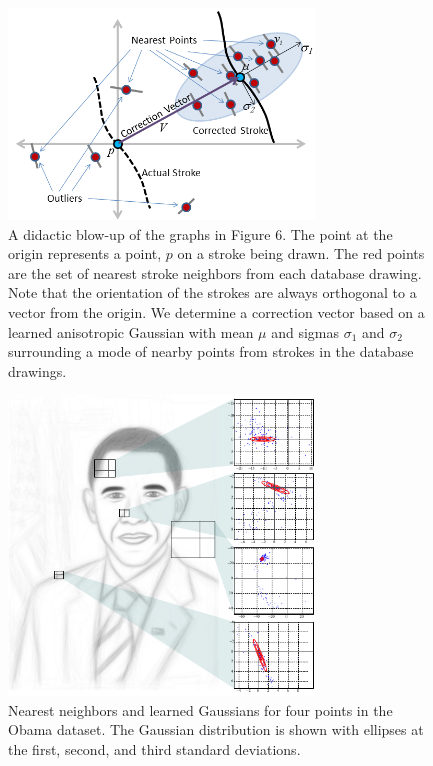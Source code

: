 \begin{figure}
  \centering%
  \includegraphics[width=3.2in]{ellipse.png}
  \caption{A didactic blow-up of the graphs in Figure 6. The point at the origin represents a point, $p$ on a stroke being drawn. The red points are the set of nearest stroke neighbors from each database drawing. Note that the orientation of the strokes are always orthogonal to a vector from the origin. We determine a correction vector based on a learned anisotropic Gaussian with mean $\mu$ and sigmas $\sigma_1$ and $\sigma_2$ surrounding a mode of nearby points from strokes in the database drawings.}
  \label{fig:ellipse}
\end{figure}

\begin{figure}
  \centering%
  \includegraphics[width=3.2in]{figures/nearest-neighbor-plots.pdf}
  \caption{Nearest neighbors and learned Gaussians for four points in the Obama dataset.  The Gaussian distribution is shown with ellipses at the first, second, and third standard deviations.}
  \label{fig:neighbors}
\end{figure}


